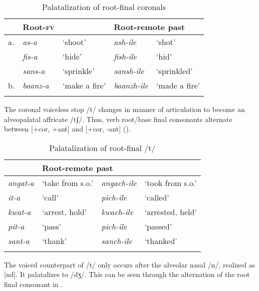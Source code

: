 \documentclass[output=paper]{langsci/langscibook}
\begin{document}
\begin{table}
\begin{tabularx}{\textwidth}{llXlX}
\lsptoprule
 & Root-\textsc{fv} &  & \multicolumn{2}{l}{Root-remote past} \\
\midrule
a. & \textit{as-a} & `shoot' & \textit{ash-ile} & `shot' \\
 & \textit{fis-a} & `hide' & \textit{fish-ile} & `hid' \\
 & \textit{sans-a} & `sprinkle' & \textit{sansh-ile} & `sprinkled' \\
\tablevspace
b. & \textit{baanz-a} & `make a fire' & \textit{baanzh-ile} & `made a fire' \\

\lspbottomrule
\end{tabularx}

\caption{Palatalization of root-final coronals}
\label{tab:9.kawasha}

 \end{table}


The coronal voiceless stop /t/ changes in manner of articulation to become an alveopalatal affricate /tʃ/. Thus, verb root/base final consonants alternate between [+cor, +ant] and [+cor, -ant] ().


\begin{table}
\begin{tabularx}{\textwidth}{XXXX}
\lsptoprule
\multicolumn{2}{l}{Root/stem-\textsc{fv}}  & \multicolumn{2}{l}{Root-remote past} \\
\midrule
\textit{angat-a} & `take from s.o.' & \textit{angach-ile} & `took from s.o.' \\
\textit{it-a} & `call' & \textit{pich-ile} & `called' \\
\textit{kwat-a} & `arrest, hold' & \textit{kwach-ile} & `arrested, held' \\
\textit{pit-a} & `pass' & \textit{pich-ile} & `passed' \\
\textit{sant-a} & `thank' & \textit{sanch-ile} & `thanked' \\

\lspbottomrule
\end{tabularx}

\caption{Palatalization of root-final /t/}
\label{tab:10.kawasha}

 \end{table}




The voiced counterpart of /t/ only occurs after the alveolar nasal /n/, realized as [nd]. It palatalizes to /dʒ/. This can be seen through the alternation of the root final consonant in .
\end{document}
